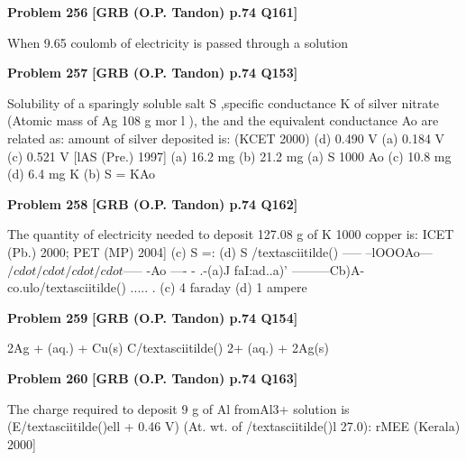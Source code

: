 \begin{problembox}
\textbf{Problem 256} \hfill \textbf{[GRB (O.P. Tandon) p.74 Q161]}
\label{q:ext-grb_all_questions-256}

When 9.65 coulomb of electricity is passed through a solution
\end{problembox}

\begin{problembox}
\textbf{Problem 257} \hfill \textbf{[GRB (O.P. Tandon) p.74 Q153]}
\label{q:ext-grb_all_questions-257}

Solubility of a sparingly soluble salt S ,specific conductance K 
of silver nitrate (Atomic mass of Ag 
108 g mor
l
), the 
and the equivalent conductance Ao are related as: 
amount of silver deposited is: 
(KCET 2000) 
(d) 0.490 V 
(a) 0.184 V 
(c) 0.521 V 
[lAS (Pre.) 1997] 
(a) 16.2 mg 
(b) 21.2 mg 
(a) S 
1000 Ao 
(c) 10.8 mg 
(d) 6.4 mg 
K 
(b) S = KAo
\end{problembox}

\begin{problembox}
\textbf{Problem 258} \hfill \textbf{[GRB (O.P. Tandon) p.74 Q162]}
\label{q:ext-grb_all_questions-258}

The quantity of electricity needed to deposit 127.08 g of 
K 
1000 
copper is: 
ICET (Pb.) 2000; PET (MP) 2004] 
(c) S =: 
(d) S /textasciitilde() 
----- --lOOOAo---$/cdot$$/cdot$$/cdot$$/cdot$----- -Ao ---- - \underline{\hspace{1cm}} .-(a)J faI:ad..a)' \underline{\hspace{1cm}} ---------Cb)A-co.ulo/textasciitilde() \underline{\hspace{1cm}} ..... \underline{\hspace{1cm}} . 
(c) 4 faraday 
(d) 1 ampere
\end{problembox}

\begin{problembox}
\textbf{Problem 259} \hfill \textbf{[GRB (O.P. Tandon) p.74 Q154]}
\label{q:ext-grb_all_questions-259}

2Ag + (aq.) + Cu(s) 
C/textasciitilde() 2+ (aq.) + 2Ag(s)
\end{problembox}

\begin{problembox}
\textbf{Problem 260} \hfill \textbf{[GRB (O.P. Tandon) p.74 Q163]}
\label{q:ext-grb_all_questions-260}

The charge required to deposit 9 g of Al fromAl3+ solution is 
(E/textasciitilde()ell 
+ 0.46 V) 
(At. wt. of /textasciitilde()l 27.0): 
rMEE (Kerala) 2000]
\end{problembox}


